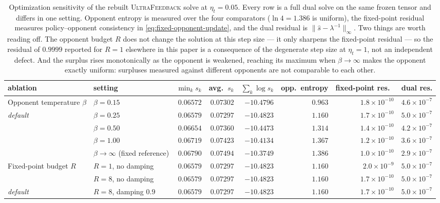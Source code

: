 \documentclass{article}
\theoremstyle{remark}
\theoremstyle{plain}
\begin{document}
\begin{table}[t]
\centering\scriptsize
\setlength{\tabcolsep}{2.6pt}
\caption{Optimization sensitivity of the rebuilt \textsc{UltraFeedback} solve at $\eta_t=0.05$. Every row is a full dual solve on the same frozen tensor and differs in one setting. Opponent entropy is measured over the four comparators ($\ln 4=1.386$ is uniform), the fixed-point residual measures policy--opponent consistency in \eqref{eq:fixed-opponent-update}, and the dual residual is $\|\widehat s-\lambda^{-1}\|_\infty$. Two things are worth reading off. The opponent budget $R$ does not change the solution at this step size --- it only sharpens the fixed-point residual --- so the residual of $0.9999$ reported for $R=1$ elsewhere in this paper is a consequence of the degenerate step size at $\eta_t=1$, not an independent defect. And the surplus rises monotonically as the opponent is weakened, reaching its maximum when $\beta\to\infty$ makes the opponent exactly uniform: surpluses measured against different opponents are not comparable to each other.}
\label{tab:optimization-ablation}
\begin{tabular}{llrrrrrr}
\toprule
ablation & setting & $\min_k s_k$ & avg.\ $s_k$ & $\sum_k\log s_k$ & opp.\ entropy & fixed-point res.\ & dual res.\\
\midrule
Opponent temperature $\beta$ & $\beta=0.15$ & $0.06572$ & $0.07302$ & $-10.4796$ & $0.963$ & $1.8\times10^{-10}$ & $4.6\times10^{-7}$\\
\emph{default} & $\beta=0.25$ & $0.06579$ & $0.07297$ & $-10.4823$ & $1.160$ & $1.7\times10^{-10}$ & $5.0\times10^{-7}$\\
 & $\beta=0.50$ & $0.06654$ & $0.07360$ & $-10.4473$ & $1.314$ & $1.4\times10^{-10}$ & $4.2\times10^{-7}$\\
 & $\beta=1.00$ & $0.06719$ & $0.07423$ & $-10.4134$ & $1.367$ & $1.2\times10^{-10}$ & $3.6\times10^{-7}$\\
 & $\beta\to\infty$ (fixed reference) & $0.06790$ & $0.07494$ & $-10.3749$ & $1.386$ & $1.0\times10^{-10}$ & $2.9\times10^{-7}$\\
\midrule
Fixed-point budget $R$ & $R=1$, no damping & $0.06579$ & $0.07297$ & $-10.4823$ & $1.160$ & $2.0\times10^{-9}$ & $5.0\times10^{-7}$\\
 & $R=8$, no damping & $0.06579$ & $0.07297$ & $-10.4823$ & $1.160$ & $1.7\times10^{-10}$ & $5.0\times10^{-7}$\\
\emph{default} & $R=8$, damping $0.9$ & $0.06579$ & $0.07297$ & $-10.4823$ & $1.160$ & $1.7\times10^{-10}$ & $5.0\times10^{-7}$\\

\end{tabular}
\end{table}
\end{document}
